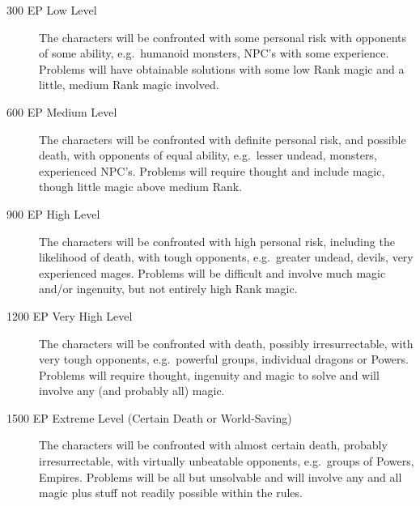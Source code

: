 \documentclass{article}
\begin{document}
\begin{multicols}{2}
\begin{description}
\item[300 EP Low Level] The characters will be confronted with some
personal risk with opponents of some ability, e.g.\ humanoid monsters,
NPC's with some experience.  Problems will have obtainable solutions
with some low Rank magic and a little, medium Rank magic involved.

\item[600 EP Medium Level] The characters will be confronted with
definite personal risk, and possible death, with opponents of equal
ability, e.g.\ lesser undead, monsters, experienced NPC's.  Problems
will require thought and include magic, though little magic above
medium Rank.

\item[900 EP High Level] The characters will be confronted with high
personal risk, including the likelihood of death, with tough
opponents, e.g.\  greater undead, devils, very experienced mages.
Problems will be difficult and involve much magic and/or ingenuity,
but not entirely high Rank magic.

\item[1200 EP Very High Level] The characters will be confronted with
death, possibly irresurrectable, with very tough opponents, e.g.\
powerful groups, individual dragons or Powers.  Problems will require
thought, ingenuity and magic to solve and will involve any (and
probably all) magic.

\item[1500 EP Extreme Level (Certain Death or World-Saving)] The
characters will be confronted with almost certain death, probably
irresurrectable, with virtually unbeatable opponents, e.g.\ groups of
Powers, Empires.  Problems will be all but unsolvable and will involve
any and all magic plus stuff not readily possible within the rules.
\end{description}

\end{multicols} 

\pagebreak



\begin{multicols}{2}

\setcounter{secnumdepth}{3}





\end{multicols}
\end{document}
